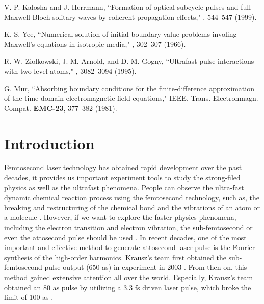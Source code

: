 \documentclass[10pt,letterpaper]{article}
\begin{document}
\begin{thebibliography}{99}
V. P. Kalosha and J. Herrmann, ``Formation of optical subcycle pulses and full Maxwell-Bloch solitary waves by coherent propagation effects," , 544--547 (1999).

K. S. Yee, ``Numerical solution of initial boundary value problems involing Maxwell's equations in isotropic media," , 302--307 (1966).

R. W. Ziolkowski, J. M. Arnold, and D. M. Gogny, ``Ultrafast pulse interactions with two-level atoms," , 3082--3094 (1995).

G. Mur, ``Absorbing boundary conditions for the finite-difference approximation of the time-domain electromagnetic-field equations," IEEE. Trans. Electronmagn. Compat. {\bf EMC-23}, 377--382 (1981).
	
\end{thebibliography}

\section{Introduction}
Femtosecond laser technology has obtained rapid development over the past decades, it provides us important experiment tools to study the strong-filed physics as well as the ultrafast phenomena. People can observe the ultra-fast dynamic chemical reaction process using the femtosecond technology, such as, the breaking and restructuring of the chemical bond \cite{Mokhtari-chemical-bond-Nature-1990} and the vibrations of an atom or a molecule \cite{Ergler-Vibration-PRL-2006}. However, if we want to explore the faster physics phenomena, including the electron transition and electron vibration, the sub-femtosecond or even the attosecond pulse should be used \cite{Uiberacker-Attosecond-real-time-Nature-2007}. In recent decades, one of the most important and effective method to generate attosecond laser pulse is the Fourier synthesis of the high-order harmonics. Krausz's team first obtained the sub-femtosecond pulse output (650 as) in experiment in 2003 \cite{Krausz-Attosecon-Review-2009}. From then on, this method gained extensive attention all over the world. Especially, Krausz's team obtained an 80 as pulse by utilizing a 3.3 fs driven laser pulse, which broke the limit of 100 as \cite{Krausz-Attosecon-Review-2009}.
\end{document}
